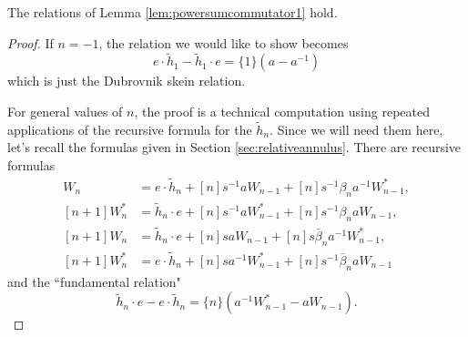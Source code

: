 \begin{lemma}
The relations of Lemma \ref{lem:powersumcommutator1} hold.
\end{lemma}
\begin{proof}
If $n=-1$, the relation we would like to show becomes 
\begin{equation*}
e \cdot \tilde{h}_1 - \tilde{h}_1 \cdot e = \{1\} \left( a - a^{-1} \right)
\end{equation*}
which is just the Dubrovnik skein relation. 

For general values of $n$, the proof is a technical computation using repeated applications of the recursive formula for the $\tilde{h}_n$. Since we will need them here, let's recall the formulas given in Section \ref{sec:relativeannulus}. There are recursive formulas
\begin{align}
[n+1] W_n &= e \cdot \tilde{h}_n + [n] s^{-1} a W_{n-1} + [n] s^{-1} \beta_n a^{-1} W^*_{n-1}, \label{eq:r1} \\
[n+1] W^*_n &= \tilde{h}_n \cdot e + [n] s^{-1} a W^*_{n-1} + [n] s^{-1} \beta_n a W_{n-1}, \label{eq:r2} \\
[n+1] W_n &= \tilde{h}_n \cdot e + [n] s a W_{n-1} + [n] s \bar{\beta}_n a^{-1} W^*_{n-1}, \label{eq:r3} \\
[n+1] W^*_n &= e \cdot \tilde{h}_n + [n] s a^{-1} W^*_{n-1} + [n] s^{-1} \bar{\beta}_n a W_{n-1} \label{eq:r4}
\end{align}
and the ``fundamental relation"
\begin{equation}
\tilde{h}_n \cdot e - e \cdot \tilde{h}_n = \{n\} (a^{-1} W^*_{n-1} - a W_{n-1}). \label{eq:f}
\end{equation}


\end{proof}
